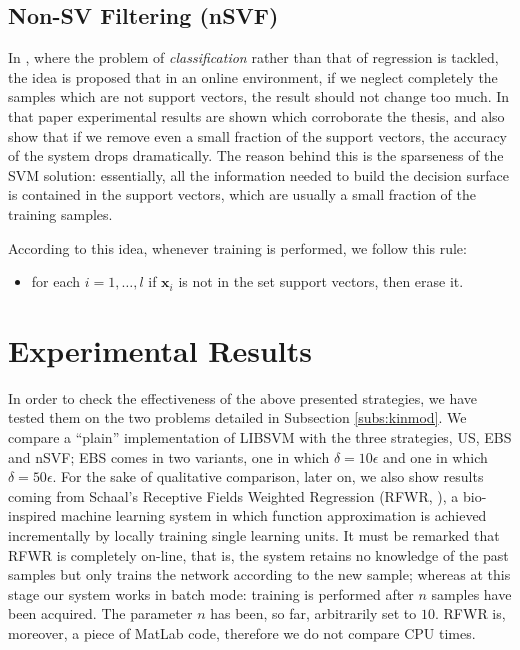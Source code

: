 \documentclass[conference]{IEEEtran}
\def\xx{\mathbf{x}}
\begin{document}
\subsection{Non-SV Filtering (nSVF)}

In \cite{syed99incremental}, where the problem of
\emph{classification} rather than that of regression is tackled, the
idea is proposed that in an online environment, if we neglect
completely the samples which are not support vectors, the result
should not change too much. In that paper experimental results are
shown which corroborate the thesis, and also show that if we remove
even a small fraction of the support vectors, the accuracy of the
system drops dramatically. The reason behind this is the sparseness of
the SVM solution: essentially, all the information needed to build the
decision surface is contained in the support vectors, which are
usually a small fraction of the training samples.

According to this idea, whenever training is performed, we follow this
rule:

\begin{itemize}
  \item for each $i=1,\ldots,l$ if $\xx_i$ is not in the set support
    vectors, then erase it.
\end{itemize}

\section{Experimental Results}
\label{sec:exp}

In order to check the effectiveness of the above presented strategies,
we have tested them on the two problems detailed in Subsection
\ref{subs:kinmod}. We compare a ``plain'' implementation of LIBSVM
with the three strategies, US, EBS and nSVF; EBS comes in two
variants, one in which $\delta = 10\epsilon$ and one in which $\delta
= 50\epsilon$. For the sake of qualitative comparison, later on, we
also show results coming from Schaal's Receptive Fields Weighted
Regression (RFWR, \cite{schaal98constructive}), a bio-inspired machine
learning system in which function approximation is achieved
incrementally by locally training single learning units. It must be
remarked that RFWR is completely on-line, that is, the system retains
no knowledge of the past samples but only trains the network according
to the new sample; whereas at this stage our system works in batch
mode: training is performed after $n$ samples have been acquired. The
parameter $n$ has been, so far, arbitrarily set to $10$. RFWR is,
moreover, a piece of MatLab code, therefore we do not compare CPU
times.
\end{document}
